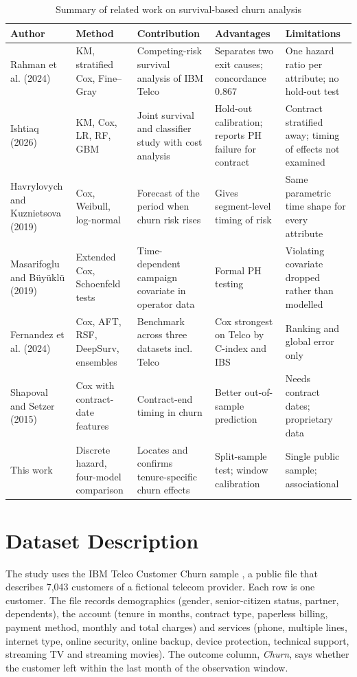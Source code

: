 \documentclass[conference]{IEEEtran}
\begin{document}
\begin{table}[t]
\caption{Summary of related work on survival-based churn analysis}
\label{tab:related}
\centering
\footnotesize
\begin{tabular}{L{2.5cm}L{2.5cm}L{3.7cm}L{3.4cm}L{3.7cm}}
\toprule
Author & Method & Contribution & Advantages & Limitations \\
\midrule
Rahman et al. (2024) \cite{rahman2024} & KM, stratified Cox, Fine--Gray & Competing-risk survival analysis of IBM Telco & Separates two exit causes; concordance 0.867 & One hazard ratio per attribute; no hold-out test \\
Ishtiaq (2026) \cite{ishtiaq2026} & KM, Cox, LR, RF, GBM & Joint survival and classifier study with cost analysis & Hold-out calibration; reports PH failure for contract & Contract stratified away; timing of effects not examined \\
Havrylovych and Kuznietsova (2019) \cite{havrylovych2019} & Cox, Weibull, log-normal & Forecast of the period when churn risk rises & Gives segment-level timing of risk & Same parametric time shape for every attribute \\
Masarifoglu and B\"uy\"ukl\"u (2019) \cite{masarifoglu2019} & Extended Cox, Schoenfeld tests & Time-dependent campaign covariate in operator data & Formal PH testing & Violating covariate dropped rather than modelled \\
Fernandez et al. (2024) \cite{fernandez2024} & Cox, AFT, RSF, DeepSurv, ensembles & Benchmark across three datasets incl. Telco & Cox strongest on Telco by C-index and IBS & Ranking and global error only \\
Shapoval and Setzer (2015) \cite{shapoval2015} & Cox with contract-date features & Contract-end timing in churn & Better out-of-sample prediction & Needs contract dates; proprietary data \\
This work & Discrete hazard, four-model comparison & Locates and confirms tenure-specific churn effects & Split-sample test; window calibration & Single public sample; associational \\
\bottomrule
\end{tabular}
\end{table}

\section{Dataset Description}

The study uses the IBM Telco Customer Churn sample \cite{ibmtelco}, a public file that describes 7,043 customers of a fictional telecom provider. Each row is one customer. The file records demographics (gender, senior-citizen status, partner, dependents), the account (tenure in months, contract type, paperless billing, payment method, monthly and total charges) and services (phone, multiple lines, internet type, online security, online backup, device protection, technical support, streaming TV and streaming movies). The outcome column, \textit{Churn}, says whether the customer left within the last month of the observation window.
\end{document}
